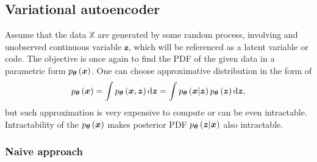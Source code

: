\subsection{Variational autoencoder}
Assume that the data $\mathbb{X}$ are generated by some random process, involving and unobserved continuous variable $\boldsymbol{z}$, which will be referenced as a latent variable or code. The objective is once again to find the PDF of the given data in a parametric form $p_{\boldsymbol{\theta}}\left(\boldsymbol{x}\right)$. One can choose approximative distribution in the form of
\begin{equation}
p_{\boldsymbol{\theta}}\left(\boldsymbol{x}\right) = \int p_{\boldsymbol{\theta}}\left(\boldsymbol{x},  \boldsymbol{z}\right)\mathrm{d}{\boldsymbol{z}} =\int p_{\boldsymbol{\theta}}\left(\boldsymbol{x}\vert \boldsymbol{z}\right)p_{\boldsymbol{\theta}}\left(\boldsymbol{z}\right)\mathrm{d}{\boldsymbol{z}},
\end{equation}
but such approximation is very expensive to compute or can be even intractable. Intractability of the $p_{\boldsymbol{\theta}}\left(\boldsymbol{x}\right)$ makes posterior PDF $p_{\boldsymbol{\theta}}\left(\boldsymbol{z}\vert\boldsymbol{x}\right)$ also intractable.
\subsubsection{Naive approach}
